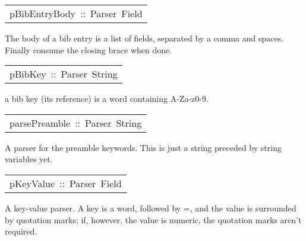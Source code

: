 \begin{haddockdesc}
\item[\begin{tabular}{@{}l}
pBibEntryBody\ ::\ Parser\ {\char 91}Field{\char 93}
\end{tabular}]\haddockbegindoc
The body of a bib entry is a list of fields, separated by a comma and spaces. Finally consume 
 the closing brace when done. 
\par

\end{haddockdesc}
\begin{haddockdesc}
\item[\begin{tabular}{@{}l}
pBibKey\ ::\ Parser\ String
\end{tabular}]\haddockbegindoc
a bib key (its reference) is a word containing {}A-Za-z0-9{}. 
\par

\end{haddockdesc}
\begin{haddockdesc}
\item[\begin{tabular}{@{}l}
parsePreamble\ ::\ Parser\ String
\end{tabular}]\haddockbegindoc
A parser for the preamble keywords. This is just a string preceded by string variables yet. 
\par

\end{haddockdesc}
\begin{haddockdesc}
\item[\begin{tabular}{@{}l}
pKeyValue\ ::\ Parser\ Field
\end{tabular}]\haddockbegindoc
A key-value parser. A key is a word, followed by =, and the value is surrounded by quotation marks;
 if, however, the value is numeric, the quotation marks aren't required. 
\par

\end{haddockdesc}